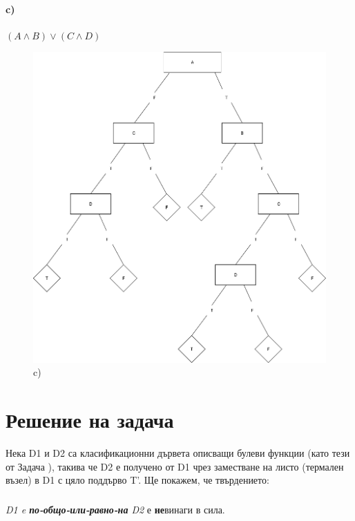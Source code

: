 \documentclass[12pt]{article}
\begin{document}
	\newpage

	\paragraph{c)} $(A \land B) \lor (C \land D)$
	\begin{figure}[H]
		\centering
		\includegraphics[width=150mm]{Untitled Diagram5.png} 
		\caption{c)}
	\end{figure}
	
	\newpage
	
	\section{Решение на задача }
	
	Нека D1 и D2 са класификационни дървета описващи булеви функции (като тези от Задача ), такива че D2 е получено от D1 чрез заместване на листо (термален възел) в D1 с цяло поддърво T'.\newline
	\newline
	Ще покажем, че твърдението:
	\subparagraph{}
	\textit{D1 e \textbf{по-общо-или-равно-на} D2}
	\newline\newline
	е \textbf{не}винаги в сила.
	
\end{document}
